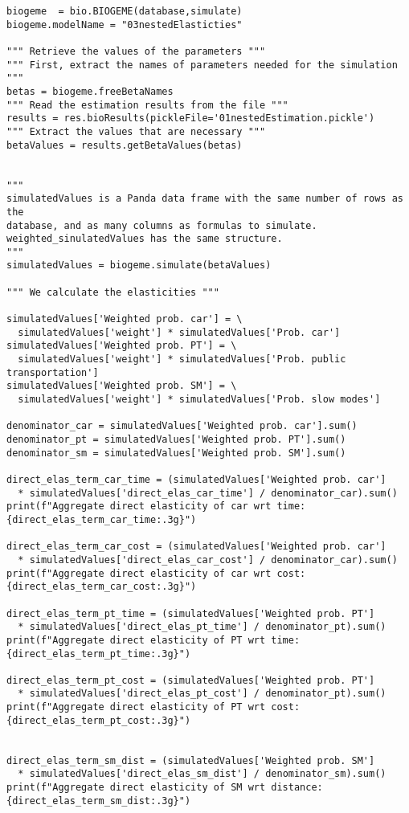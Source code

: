 \documentclass[12pt,a4paper]{article}
\begin{document}
\begin{lstlisting}[style=numbers]
biogeme  = bio.BIOGEME(database,simulate)
biogeme.modelName = "03nestedElasticties"

""" Retrieve the values of the parameters """
""" First, extract the names of parameters needed for the simulation """
betas = biogeme.freeBetaNames
""" Read the estimation results from the file """
results = res.bioResults(pickleFile='01nestedEstimation.pickle')
""" Extract the values that are necessary """
betaValues = results.getBetaValues(betas)


"""
simulatedValues is a Panda data frame with the same number of rows as the
database, and as many columns as formulas to simulate.
weighted_sinulatedValues has the same structure. 
"""
simulatedValues = biogeme.simulate(betaValues)

""" We calculate the elasticities """

simulatedValues['Weighted prob. car'] = \
  simulatedValues['weight'] * simulatedValues['Prob. car']
simulatedValues['Weighted prob. PT'] = \
  simulatedValues['weight'] * simulatedValues['Prob. public transportation']
simulatedValues['Weighted prob. SM'] = \
  simulatedValues['weight'] * simulatedValues['Prob. slow modes']

denominator_car = simulatedValues['Weighted prob. car'].sum()
denominator_pt = simulatedValues['Weighted prob. PT'].sum()
denominator_sm = simulatedValues['Weighted prob. SM'].sum()

direct_elas_term_car_time = (simulatedValues['Weighted prob. car']
  * simulatedValues['direct_elas_car_time'] / denominator_car).sum()
print(f"Aggregate direct elasticity of car wrt time: {direct_elas_term_car_time:.3g}")

direct_elas_term_car_cost = (simulatedValues['Weighted prob. car']
  * simulatedValues['direct_elas_car_cost'] / denominator_car).sum()
print(f"Aggregate direct elasticity of car wrt cost: {direct_elas_term_car_cost:.3g}")

direct_elas_term_pt_time = (simulatedValues['Weighted prob. PT']
  * simulatedValues['direct_elas_pt_time'] / denominator_pt).sum()
print(f"Aggregate direct elasticity of PT wrt time: {direct_elas_term_pt_time:.3g}")

direct_elas_term_pt_cost = (simulatedValues['Weighted prob. PT']
  * simulatedValues['direct_elas_pt_cost'] / denominator_pt).sum()
print(f"Aggregate direct elasticity of PT wrt cost: {direct_elas_term_pt_cost:.3g}")


direct_elas_term_sm_dist = (simulatedValues['Weighted prob. SM']
  * simulatedValues['direct_elas_sm_dist'] / denominator_sm).sum()
print(f"Aggregate direct elasticity of SM wrt distance: {direct_elas_term_sm_dist:.3g}")
\end{lstlisting}
\end{document}
